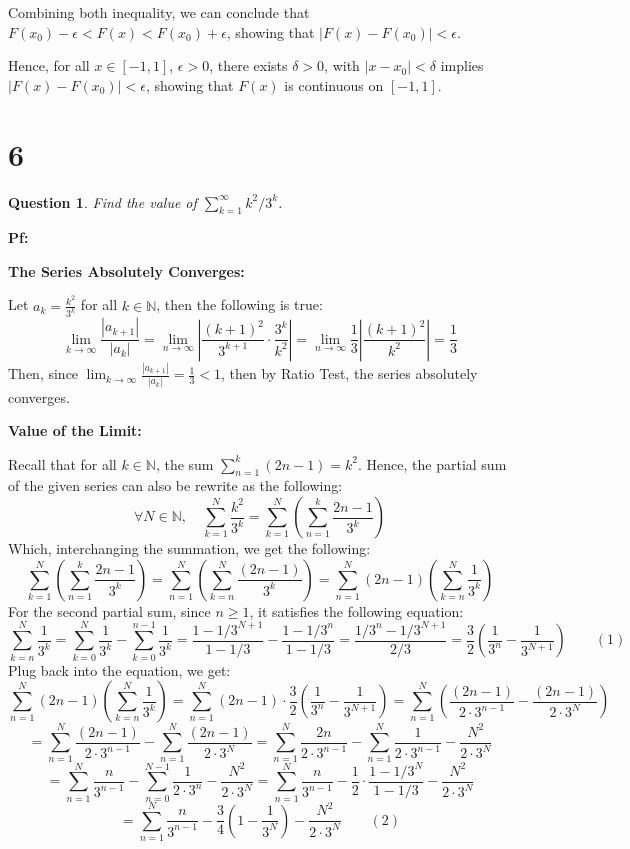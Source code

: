 \documentclass{article}
\newtheorem{question}{Question}
\begin{document}
Combining both inequality, we can conclude that $F(x_0)-\epsilon<F(x)<F(x_0)+\epsilon$, showing that $|F(x)-F(x_0)|<\epsilon$.

Hence, for all $x\in[-1,1]$, $\epsilon>0$, there exists $\delta>0$, with $|x-x_0|<\delta$ implies $|F(x)-F(x_0)|<\epsilon$, showing that $F(x)$ is continuous on $[-1,1]$.


\hfill

\hfill

\section*{6}
\begin{myBox}[]{}
    \begin{question}
        Find the value of $\sum_{k=1}^{\infty}k^2/3^k$.
    \end{question}
\end{myBox}

\textbf{Pf:}

\textbf{The Series Absolutely Converges:}

Let $a_k=\frac{k^2}{3^k}$ for all $k\in\mathbb{N}$, then the following is true:
$$\lim_{k\rightarrow\infty}\frac{|a_{k+1}|}{|a_k|} = \lim_{n\rightarrow\infty}\left|\frac{(k+1)^2}{3^{k+1}}\cdot \frac{3^k}{k^2}\right|=\lim_{n\rightarrow\infty}\frac{1}{3}\left|\frac{(k+1)^2}{k^2}\right|=\frac{1}{3}$$
Then, since $\lim_{k\rightarrow\infty}\frac{|a_{k+1}|}{|a_k|}=\frac{1}{3}<1$, then by Ratio Test, the series absolutely converges. 

\hfill

\textbf{Value of the Limit:}

Recall that for all $k\in\mathbb{N}$, the sum $\sum_{n=1}^{k}(2n-1) = k^2$. Hence, the partial sum of the given series can also be rewrite as the following:
$$\forall N\in\mathbb{N},\quad \sum_{k=1}^{N}\frac{k^2}{3^k} = \sum_{k=1}^{N}\left(\sum_{n=1}^{k}\frac{2n-1}{3^k}\right)$$
Which, interchanging the summation, we get the following:
$$\sum_{k=1}^{N}\left(\sum_{n=1}^{k}\frac{2n-1}{3^k}\right) = \sum_{n=1}^{N}\left(\sum_{k=n}^{N}\frac{(2n-1)}{3^k}\right)=\sum_{n=1}^{N}(2n-1)\left(\sum_{k=n}^{N}\frac{1}{3^k}\right)$$
For the second partial sum, since $n\geq 1$, it satisfies the following equation:
$$\sum_{k=n}^{N}\frac{1}{3^k} = \sum_{k=0}^{N}\frac{1}{3^k}-\sum_{k=0}^{n-1}\frac{1}{3^k} = \frac{1-1/3^{N+1}}{1-1/3}-\frac{1-1/3^{n}}{1-1/3} = \frac{1/3^{n}-1/3^{N+1}}{2/3} = \frac{3}{2}\left(\frac{1}{3^n}-\frac{1}{3^{N+1}}\right)\quad\quad (1)$$
Plug back into the equation, we get:
$$\sum_{n=1}^{N}(2n-1)\left(\sum_{k=n}^{N}\frac{1}{3^k}\right) = \sum_{n=1}^{N}(2n-1)\cdot\frac{3}{2}\left(\frac{1}{3^n}-\frac{1}{3^{N+1}}\right) = \sum_{n=1}^{N}\left(\frac{(2n-1)}{2\cdot 3^{n-1}}-\frac{(2n-1)}{2\cdot 3^N}\right)$$
$$=\sum_{n=1}^{N}\frac{(2n-1)}{2\cdot 3^{n-1}} - \sum_{n=1}^{N}\frac{(2n-1)}{2\cdot 3^N} = \sum_{n=1}^{N}\frac{2n}{2\cdot 3^{n-1}} - \sum_{n=1}^{N}\frac{1}{2\cdot 3^{n-1}} - \frac{N^2}{2\cdot 3^N}$$
$$= \sum_{n=1}^{N}\frac{n}{3^{n-1}} - \sum_{n=0}^{N-1}\frac{1}{2\cdot 3^{n}} - \frac{N^2}{2\cdot 3^N} = \sum_{n=1}^{N}\frac{n}{3^{n-1}} - \frac{1}{2}\cdot\frac{1-1/3^N}{1-1/3} - \frac{N^2}{2\cdot 3^N}$$
$$=\sum_{n=1}^{N}\frac{n}{3^{n-1}} - \frac{3}{4}\left(1-\frac{1}{3^N}\right) - \frac{N^2}{2\cdot 3^N}\quad\quad (2)$$
\end{document}
